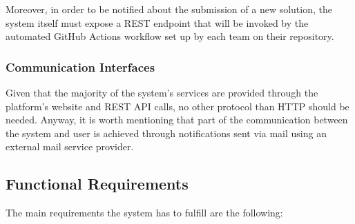 Moreover, in order to be notified about the submission of a new solution, the system itself must expose a REST endpoint that will be invoked by the automated GitHub Actions workflow set up by each team on their repository.
\subsubsection{Communication Interfaces}
Given that the majority of the system's services are provided through the platform's website and REST API calls, no other protocol than HTTP should be needed. Anyway, it is worth mentioning that part of the communication between the system and user is achieved through notifications sent via mail using an external mail service provider.
\newpage

\subsection{Functional Requirements}
The main requirements the system has to fulfill are the following:
